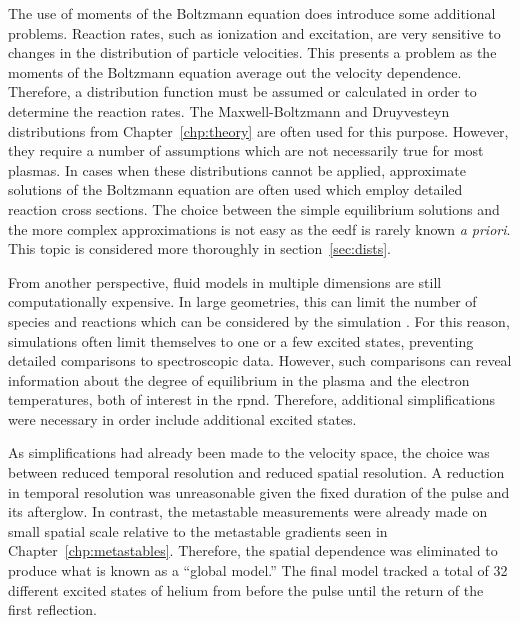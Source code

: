 The use of moments of the Boltzmann equation does introduce some additional
problems. Reaction rates, such as ionization and excitation, are very sensitive
to changes in the distribution of particle velocities. This presents a problem
as the moments of the Boltzmann equation average out the velocity dependence.
Therefore, a distribution function must be assumed or calculated in order to
determine the reaction rates. The Maxwell-Boltzmann and Druyvesteyn
distributions from Chapter~\ref{chp:theory} are often used for this purpose.
However, they require a number of assumptions which are not necessarily true for
most plasmas. In cases when these distributions cannot be applied, approximate
solutions of the Boltzmann equation are often used \cite{Hagelaar2005} which
employ detailed reaction cross sections. The choice between the simple
equilibrium solutions and the more complex approximations is not easy as the
\acs{eedf} is rarely known \emph{a priori}. This topic is considered more
thoroughly in section~\ref{sec:dists}.

From another perspective, fluid models in multiple dimensions are still
computationally expensive. In large geometries, this can limit the number of
species and reactions which can be considered by the simulation
\cite{Lieberman2005}. For this reason, simulations often limit themselves to one
or a few excited states, preventing detailed comparisons to spectroscopic data.
However, such comparisons can reveal information about the degree of equilibrium
in the plasma and the electron temperatures, both of interest in the \acs{rpnd}.
Therefore, additional simplifications were necessary in order include additional
excited states.

As simplifications had already been made to the velocity space, the choice was
between reduced temporal resolution and reduced spatial resolution. A reduction
in temporal resolution was unreasonable given the fixed duration of the pulse
and its afterglow. In contrast, the metastable measurements were already made on
small spatial scale relative to the metastable gradients seen in
Chapter~\ref{chp:metastables}. Therefore, the spatial dependence was eliminated
to produce what is known as a ``global model.'' The final model tracked a total
of 32 different excited states of helium from before the pulse until the return
of the first reflection.

